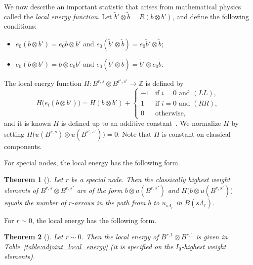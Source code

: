 \documentclass[reqno]{amsart}
\newcommand{\clfw}{\overline{\Lambda}} %
\newcommand{\ZZ}{\mathbb{Z}}
\newcommand{\defn}[1]{{\color{darkred}\emph{#1}}} %
\theoremstyle{plain}
\newtheorem{thm}{Theorem}[section]
\theoremstyle{definition}
\numberwithin{equation}{section}
\begin{document}
We now describe an important statistic that arises from mathematical physics called the \defn{local energy function}.
Let $\widetilde{b}' \otimes \widetilde{b} = R(b \otimes b')$, and define the following conditions:
\begin{itemize}
\item[(LL)] $e_0(b \otimes b') = e_0 b \otimes b' \text{ and } e_0(\widetilde{b}' \otimes \widetilde{b}) = e_0 \widetilde{b}' \otimes \widetilde{b}$;
\item[(RR)] $e_0(b \otimes b') = b \otimes e_0 b' \text{ and } e_0(\widetilde{b}' \otimes \widetilde{b}) = \widetilde{b}' \otimes e_0 \widetilde{b}$.
\end{itemize}
The local energy function $H \colon B^{r,s} \otimes B^{r',s'} \to \ZZ$ is defined by
\begin{equation}
\label{eq:local_energy}
H\bigl( e_i(b \otimes b') \bigr) = H(b \otimes b') + \begin{cases}
-1 & \text{if } i = 0 \text{ and } (LL), \\
1 & \text{if } i = 0 \text{ and } (RR), \\
0 & \text{otherwise,}
\end{cases}
\end{equation}
and it is known $H$ is defined up to an additive constant~\cite{KKMMNN91}.
We normalize $H$ by setting $H\bigl( u(B^{r ,s}) \otimes u(B^{r',s'}) \bigr) = 0$.
Note that $H$ is constant on classical components.

For special nodes, the local energy has the following form.

\begin{thm}[{\cite[Thm.~7.5]{Scrimshaw17}}]
\label{thm:minuscule_local_energy}
Let $r$ be a special node.
Then the classically highest weight elements of $B^{r,s} \otimes B^{r,s'}$ are of the form $b \otimes u(B^{r,s'})$ and $H\bigl(b \otimes u(B^{r,s'})\bigr)$ equals the number of $r$-arrows in the path from $b$ to $u_{s\clfw_r}$ in $B(s\clfw_r)$.
\end{thm}

For $r \sim 0$, the local energy has the following form.

\begin{thm}[{\cite[Thm.~6.2]{BFKL06}}]
\label{thm:adjoint_local_energy}
Let $r \sim 0$. Then the local energy of $B^{r,1} \otimes B^{r,1}$ is given in Table~\ref{table:adjoint_local_energy} (it is specified on the $I_0$-highest weight elements).
\end{thm}
\end{document}
